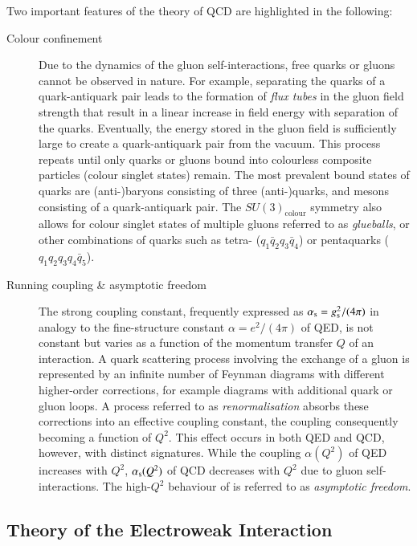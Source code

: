 Two important features of the theory of QCD are highlighted in the following:
\begin{description}

\item[Colour confinement] Due to the dynamics of the gluon self-interactions,
  free quarks or gluons cannot be observed in nature. For example, separating
  the quarks of a quark-antiquark pair leads to the formation of \emph{flux
    tubes} in the gluon field strength that result in a linear increase in field
  energy with separation of the quarks. Eventually, the energy stored in the
  gluon field is sufficiently large to create a quark-antiquark pair from the
  vacuum. This process repeats until only quarks or gluons bound into colourless
  composite particles (colour singlet states) remain. The most prevalent bound
  states of quarks are (anti-)baryons consisting of three (anti-)quarks, and
  mesons consisting of a quark-antiquark pair. The $SU(3)_{\text{colour}}$
  symmetry also allows for colour singlet states of multiple gluons referred to
  as \emph{glueballs}, or other combinations of quarks such as tetra-
  ($q_1 \bar{q}_2 q_3 \bar{q}_4$) or pentaquarks ($q_1 q_2 q_3 q_4 \bar{q}_5$).

\item[Running coupling \& asymptotic freedom] The strong coupling constant,
  frequently expressed as $\alpha_{\text{s}} = g_{\text{s}}^2 / (4 \pi)$ in analogy to the
  fine-structure constant $\alpha = e^2 / (4 \pi)$ of QED, is not constant but
  varies as a function of the momentum transfer $Q$ of an interaction. A quark
  scattering process involving the exchange of a gluon is represented by an
  infinite number of Feynman diagrams with different higher-order corrections,
  for example diagrams with additional quark or gluon loops. A process referred
  to as \emph{renormalisation} absorbs these corrections into an effective
  coupling constant, the coupling consequently becoming a function of
  $Q^2$. This effect occurs in both QED and QCD, however, with distinct
  signatures. While the coupling $\alpha(Q^2)$ of QED increases with $Q^2$,
  $\alpha_{\text{s}}(Q^2)$ of QCD decreases with $Q^2$ due to gluon self-interactions. The
  high-$Q^2$ behaviour of \alphas is referred to as \emph{asymptotic freedom}.
\end{description}


\subsection{Theory of the Electroweak Interaction}%
\label{seq:theory_ewk}

